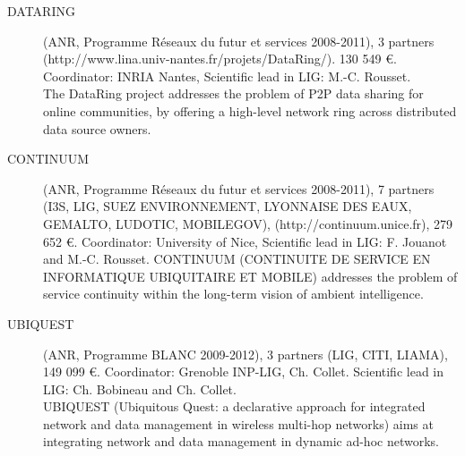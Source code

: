 \begin{description}
\item[DATARING] (ANR, Programme R{\'e}seaux du futur et services 2008-2011), 3 partners \\
(http://www.lina.univ-nantes.fr/projets/DataRing/). 130 549 \euro. Coordinator: INRIA Nantes, Scientific lead in LIG: M.-C. Rousset. \\
The DataRing project addresses the problem of P2P data sharing for online communities, by offering a high-level network ring across distributed data source owners. 

\item[CONTINUUM] (ANR, Programme R{\'e}seaux du futur et services 2008-2011),  7 partners (I3S, LIG, SUEZ ENVIRONNEMENT, LYONNAISE DES EAUX, GEMALTO, LUDOTIC, MOBILEGOV), (http://continuum.unice.fr), 279 652 \euro. Coordinator: University of Nice, Scientific lead in LIG: F. Jouanot and M.-C. Rousset. CONTINUUM (CONTINUITE DE SERVICE EN INFORMATIQUE UBIQUITAIRE ET MOBILE) addresses the problem of service continuity within the long-term vision of ambient intelligence. 

\item[UBIQUEST] (ANR, Programme BLANC 2009-2012), 3 partners (LIG, CITI, LIAMA), 149 099 \euro. Coordinator: Grenoble INP-LIG, Ch. Collet. Scientific lead in LIG: Ch. Bobineau and Ch. Collet. \\
UBIQUEST (Ubiquitous Quest: a declarative approach for integrated network and data management in wireless multi-hop networks) aims at integrating network and data management in dynamic ad-hoc networks. 


\end{description}
